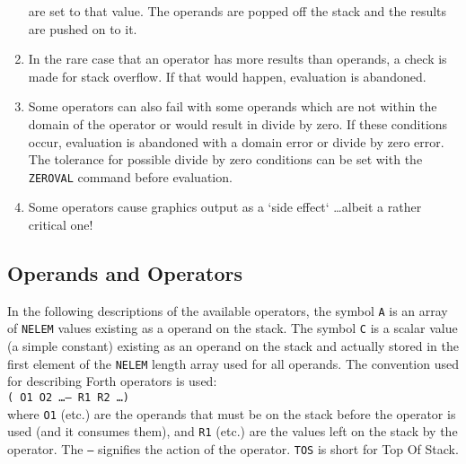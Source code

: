 \documentclass[a4paper,twoside,11pt]{article}
\newcommand{\textttc}[1]{\texttt{\textcolor{OurRed}{#1}}}
\begin{document}
\begin{enumerate}
	are set to that value. The operands are popped off the stack and the results are pushed on to it.
\item In the rare case that an operator has more results than operands, a check is made for stack overflow. If that
	would happen, evaluation is abandoned.
\item Some operators can also fail with some operands which are not within the domain of the operator or would result
	in divide by zero. If these conditions occur, evaluation is abandoned with a domain error or divide by zero error.
	The tolerance for possible divide by zero conditions can be set with the \textttc{ZEROVAL} command before evaluation.
\item Some operators cause graphics output as a `side effect` \ldots albeit a rather critical one!
\end{enumerate}

\subsection{Operands and Operators}
In the following descriptions of the available operators, the symbol \texttt{A} is an array of \texttt{NELEM} values 
existing as a operand on the stack. The symbol \texttt{C} is a scalar value (a simple constant) existing as an operand
on the stack and actually stored in the first element of the \texttt{NELEM} length array used for all operands. The convention used for describing Forth operators is used:\\
\texttt{( O1 O2 \ldots -- R1 R2 \ldots )} \\
where \texttt{O1} (etc.) are the operands that must be on the stack before the operator is used (and it consumes them),
and \texttt{R1} (etc.) are the values left on the stack by the operator. The \texttt{--} signifies the action of the operator.
\texttt{TOS} is short for Top Of Stack.
\end{document}

